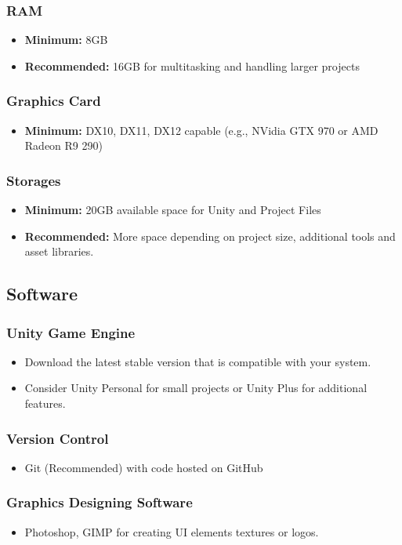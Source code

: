 \subsubsection{RAM}
\begin{itemize}
	\item \textbf{Minimum:} 8GB
	\item \textbf{Recommended:} 16GB for multitasking and handling larger projects
\end{itemize}
\subsubsection{Graphics Card}
\begin{itemize}
	\item \textbf{Minimum:} DX10, DX11, DX12 capable (e.g., NVidia GTX 970 or AMD Radeon R9 290)
\end{itemize}
\subsubsection{Storages}
\begin{itemize}
	\item \textbf{Minimum:} 20GB available space for Unity and Project Files
	\item \textbf{Recommended:} More space depending on project size, additional tools and asset libraries.
\end{itemize}
\subsection{Software}
\subsubsection{Unity Game Engine}
\begin{itemize}
	\item Download the latest stable version that is compatible with your system.
	\item Consider Unity Personal for small projects or Unity Plus for additional features.
\end{itemize}
\subsubsection{Version Control}
\begin{itemize}
	\item Git (Recommended) with code hosted on GitHub
\end{itemize}
\subsubsection{Graphics Designing Software}
\begin{itemize}
	\item Photoshop, GIMP for creating UI elements textures  or logos.
\end{itemize}
